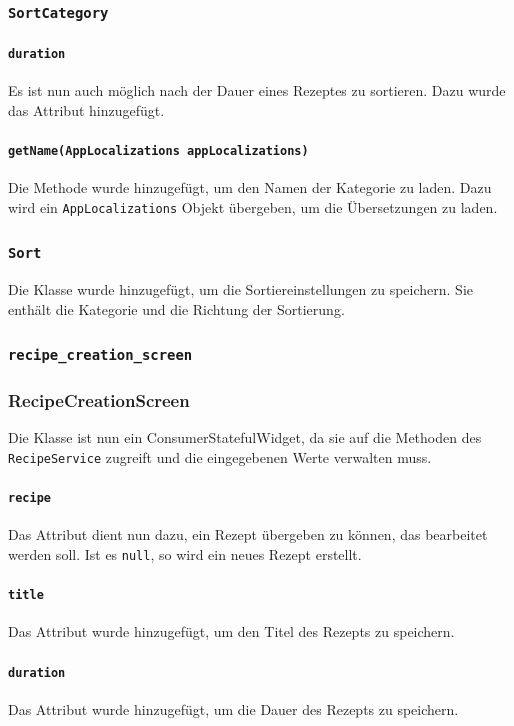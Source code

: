 \documentclass{implementierungsheft}
\begin{document}
\subsubsection*{\texttt{SortCategory}}
\paragraph*{\texttt{duration}}
Es ist nun auch möglich nach der Dauer eines Rezeptes zu sortieren. Dazu wurde das Attribut hinzugefügt.
\paragraph*{\texttt{getName(AppLocalizations appLocalizations)}}
Die Methode wurde hinzugefügt, um den Namen der Kategorie zu laden. Dazu wird ein \texttt{AppLocalizations} Objekt übergeben, um die Übersetzungen zu laden.
\subsubsection*{\texttt{Sort}}
Die Klasse wurde hinzugefügt, um die Sortiereinstellungen zu speichern. Sie enthält die Kategorie und die Richtung der Sortierung.
\subsubsection{\texttt{recipe\_creation\_screen}}
\subsubsection*{RecipeCreationScreen}
Die Klasse ist nun ein ConsumerStatefulWidget, da sie auf die Methoden des \texttt{RecipeService} zugreift und die eingegebenen Werte verwalten muss.
\paragraph{\texttt{recipe}}
Das Attribut dient nun dazu, ein Rezept übergeben zu können, das bearbeitet werden soll. Ist es \texttt{null}, so wird ein neues Rezept erstellt.
\paragraph{\texttt{title}}
Das Attribut wurde hinzugefügt, um den Titel des Rezepts zu speichern.
\paragraph{\texttt{duration}}
Das Attribut wurde hinzugefügt, um die Dauer des Rezepts zu speichern.
\end{document}

